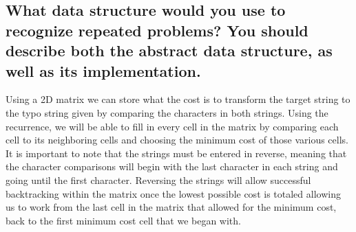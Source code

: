 \documentclass[letterpaper,12pt]{article}
\begin{document}
\subsection{What data structure would you use to recognize repeated problems? You should describe both the abstract data structure, as well as its implementation.}
Using a 2D matrix we can store what the cost is to transform the target string to the typo string given by comparing the characters in both strings. Using the recurrence, we will be able to fill in every cell in the matrix by comparing each cell to its neighboring cells and choosing the minimum cost of those various cells. It is important to note that the strings must be entered in reverse, meaning that the character comparisons will begin with the last character in each string and going until the first character. Reversing the strings will allow successful backtracking within the matrix once the lowest possible cost is totaled allowing us to work from the last cell in the matrix that allowed for the minimum cost, back to the first minimum cost cell that we began with.  
\end{document}
